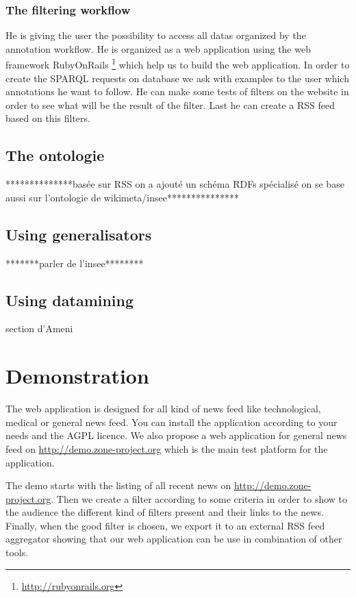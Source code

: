 \documentclass{llncs}
\begin{document}
\subsubsection{The filtering workflow}
He is giving the user the possibility to access all datas organized by the annotation workflow. He is organized as a web application using the web framework RubyOnRails \footnote{\url{http://rubyonrails.org}} which help us to build the web application. In order to create the SPARQL requests on database we ask with examples to the user which annotations he want to follow. He can make some tests of filters on the website in order to see what will be the result of the filter. Last he can create a RSS feed based on this filters.
%
\subsection{The ontologie}
%
**************basée sur RSS
on a ajouté un schéma RDFs spécialisé
on se base aussi sur l'ontologie de wikimeta/insee***************
%

%
\subsection{Using generalisators}
*******parler de l'insee********

%
\subsection{Using datamining}
section d'Ameni

\section{Demonstration}
%
The web application is designed for all kind of news feed like technological, medical or general news feed. You can install the application according to your needs and the AGPL licence. We also propose a web application for general news feed on \url{http://demo.zone-project.org} which is the main test platform for the application.

The demo starts with the listing of all recent news on \url{http://demo.zone-project.org}. Then we create a filter according to some criteria in order to show to the audience the different kind of filters present and their links to the news. Finally, when the good filter is chosen, we export it to an external RSS feed aggregator showing that our web application can be use in combination of other tools.
\end{document}

